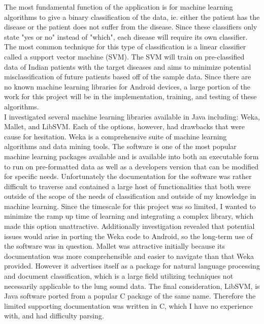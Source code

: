 \documentclass{article}
\begin{document}
 The most fundamental function of the application is for machine learning algorithms to give a binary classification of the data, ie. either the patient has the disease or the patient does not suffer from the disease. Since these classifiers only state "yes or no" instead of "which", each disease will require its own classifier. The most common technique for this type of classification is a linear classifier called a support vector machine (SVM). The SVM will train on pre-classified data of Indian patients with the target diseases and aims to minimize potential misclassification of future patients based off of the sample data. Since there are no known machine learning libraries for Android devices, a large portion of the work for this project will be in the implementation, training, and testing of these algorithms.\\
 
 I investigated several machine learning libraries available in Java including: Weka, Mallet, and LibSVM. Each of the options, however, had drawbacks that were cause for hesitation. Weka is a comprehensive suite of machine learning algorithms and data mining tools. The software is one of the most popular machine learning packages available and is available into both an executable form to run on pre-formatted data as well as a developers version that can be modified for specific needs. Unfortunately the documentation for the software was rather difficult to traverse and contained a large host of functionalities that both were outside of the scope of the needs of classification and outside of my knowledge in machine learning. Since the timescale for this project was so limited, I wanted to minimize the ramp up time of learning and integrating a complex library, which made this option unattractive. Additionally investigation revealed that potential issues would arise in porting the Weka code to Android, so the long-term use of the software was in question. Mallet was attractive initially because its documentation was more comprehensible and easier to navigate than that Weka provided. However it advertises itself as a package for natural language processing and document classification, which is a large field utilizing techniques not necessarily applicable to the lung sound data. The final consideration, LibSVM, is Java software ported from a popular C package of the same name. Therefore the limited supporting documentation was written in C, which I have no experience with, and had difficulty parsing. \cite{Weka, Mallet} \\
 \\
 
\end{document}
